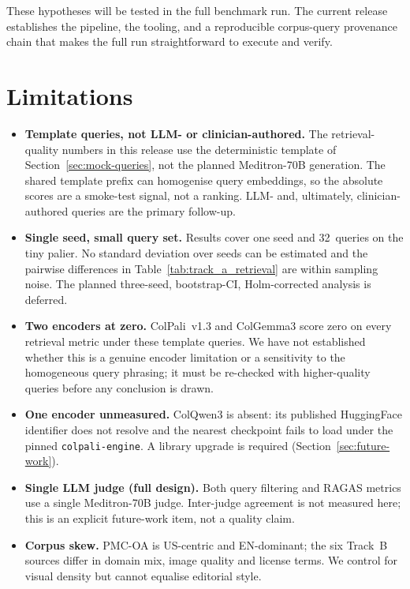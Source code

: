 \documentclass[10pt,a4paper]{article}
\begin{document}
These hypotheses will be tested in the full benchmark run. The current
release establishes the pipeline, the tooling, and a reproducible
corpus-query provenance chain that makes the full run straightforward to
execute and verify.

\section{Limitations}
\label{sec:limitations}
\begin{itemize}
  \item \textbf{Template queries, not LLM- or clinician-authored.} The
    retrieval-quality numbers in this release use the deterministic template
    of Section~\ref{sec:mock-queries}, not the planned Meditron-70B
    generation. The shared template prefix can homogenise query embeddings,
    so the absolute scores are a smoke-test signal, not a ranking. LLM- and,
    ultimately, clinician-authored queries are the primary follow-up.
  \item \textbf{Single seed, small query set.} Results cover one seed and
    32~queries on the tiny palier. No standard deviation over seeds can be
    estimated and the pairwise differences in Table~\ref{tab:track_a_retrieval}
    are within sampling noise. The planned three-seed, bootstrap-CI,
    Holm-corrected analysis is deferred.
  \item \textbf{Two encoders at zero.} ColPali~v1.3 and ColGemma3 score zero
    on every retrieval metric under these template queries. We have not
    established whether this is a genuine encoder limitation or a sensitivity
    to the homogeneous query phrasing; it must be re-checked with
    higher-quality queries before any conclusion is drawn.
  \item \textbf{One encoder unmeasured.} ColQwen3 is absent: its published
    HuggingFace identifier does not resolve and the nearest checkpoint fails
    to load under the pinned \texttt{colpali-engine}. A library upgrade is
    required (Section~\ref{sec:future-work}).
  \item \textbf{Single LLM judge (full design).} Both query filtering and
    RAGAS metrics use a single Meditron-70B judge. Inter-judge agreement is
    not measured here; this is an explicit future-work item, not a quality
    claim.
  \item \textbf{Corpus skew.} PMC-OA is US-centric and EN-dominant; the six
    Track~B sources differ in domain mix, image quality and license terms.
    We control for visual density but cannot equalise editorial style.

\end{itemize}
\end{document}
